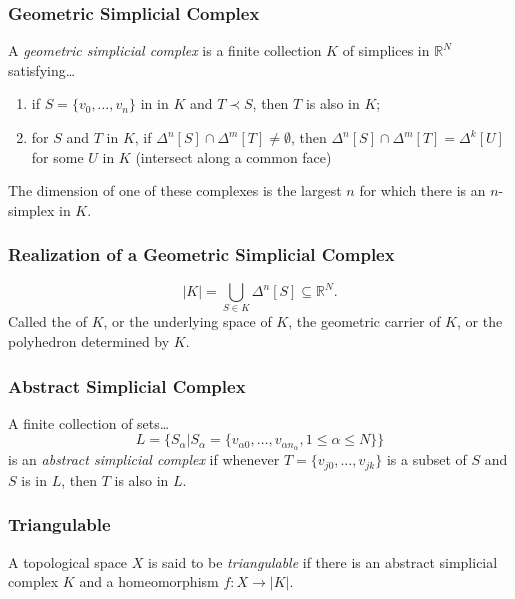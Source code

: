 \subsubsection{Geometric Simplicial Complex}\label{geometricsimplicialcomplex}
A \emph{geometric simplicial complex} is a finite collection $K$ of simplices in $\mathbb{R}^N$ satisfying\dots
\begin{enumerate}
  \item if $S = \{ v_0, \dots, v_n \}$ in in $K$ and $T \prec S$, then $T$ is also in $K$;
  \item for $S$ and $T$ in $K$, if $\Delta^n[S]\cap \Delta^m[T] \neq \emptyset$, then $\Delta^n[S] \cap \Delta^m[T] = \Delta^k[U]$ for some $U$ in $K$ (intersect along a common face)
\end{enumerate}
The dimension of one of these complexes is the largest $n$ for which there is an $n$-simplex in $K$.

\subsubsection{Realization of a Geometric Simplicial Complex}\label{realization}
$$|K| = \bigcup_{S \in K} \Delta^n[S] \subseteq \mathbb{R}^N.$$
Called the \label{realization} of $K$, or the underlying space of $K$, the geometric carrier of $K$, or the polyhedron determined by $K$.

\subsubsection{Abstract Simplicial Complex}\label{abstractsimplicialcomplex}
A finite collection of sets\dots
$$L = \{ S_{\alpha} | S_{\alpha} = \{ v_{\alpha 0}, \dots, v_{\alpha n_{\alpha}}, 1 \leq \alpha \leq N \} \}$$
is an \emph{abstract simplicial complex} if whenever $T = \{ v_{j0}, \dots, v_{jk} \}$ is a subset of $S$ and $S$ is in $L$, then $T$ is also in $L$.

\subsubsection{Triangulable}\label{triangulable}
A topological space $X$ is said to be \emph{triangulable} if there is an abstract simplicial complex $K$ and a homeomorphism $f : X \rightarrow |K|$.